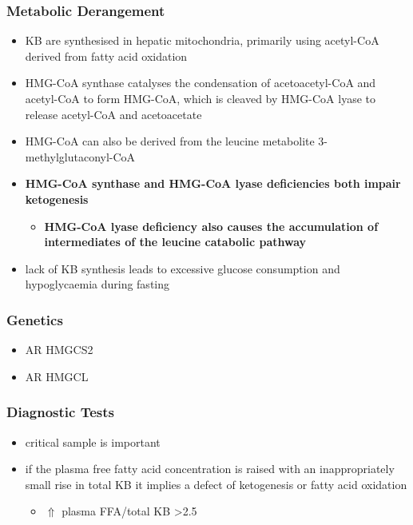 \documentclass[12pt]{scrartcl}
\begin{document}
\subsubsection{Metabolic Derangement}
\label{sec:orgdfd0ab8}
\begin{itemize}
\item KB are synthesised in hepatic mitochondria, primarily using
acetyl-CoA derived from fatty acid oxidation
\item HMG-CoA synthase catalyses the condensation of acetoacetyl-CoA and
acetyl-CoA to form HMG-CoA, which is cleaved by HMG-CoA lyase to
release acetyl-CoA and acetoacetate



\item HMG-CoA can also be derived from the leucine metabolite
3-methylglutaconyl-CoA
\item \textbf{HMG-CoA synthase and HMG-CoA lyase deficiencies both impair
ketogenesis}
\begin{itemize}
\item \textbf{HMG-CoA lyase deficiency also causes the accumulation of
intermediates of the leucine catabolic pathway}
\end{itemize}
\item lack of KB synthesis leads to excessive glucose consumption and
hypoglycaemia during fasting
\end{itemize}

\subsubsection{Genetics}
\label{sec:org8f87c2d}
\begin{itemize}
\item AR HMGCS2
\item AR HMGCL
\end{itemize}

\subsubsection{Diagnostic Tests}
\label{sec:org0c1d6d1}
\begin{itemize}
\item critical sample is important
\item if the plasma free fatty acid concentration is raised with an
inappropriately small rise in total KB it implies a defect of
ketogenesis or fatty acid oxidation 
\begin{itemize}
\item \(\Uparrow\) plasma FFA/total KB >2.5
\end{itemize}
\end{itemize}
\end{document}
